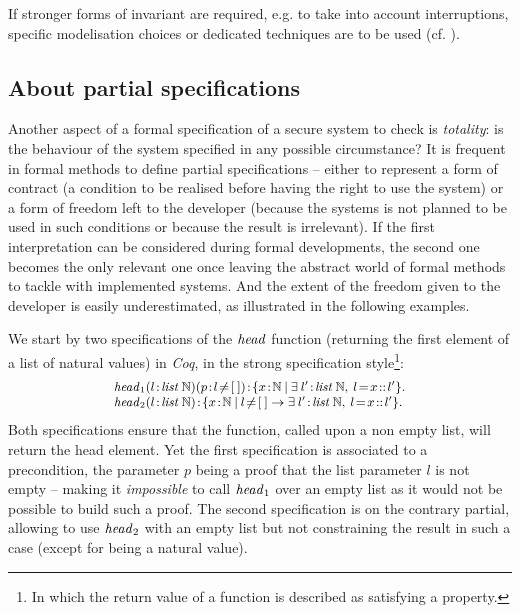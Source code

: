 \documentclass[conference]{IEEEtran}
\begin{document}
If stronger forms of invariant are required, e.g. to take into account interruptions, specific
modelisation choices or dedicated techniques are to be used (cf.
\cite{DBLP:conf/fm/AndronickCP05}).

\subsection{About partial specifications}\label{partial_spec}

Another aspect of a formal specification of a secure system to check is \emph{totality}: is
the behaviour of the system specified in any possible circumstance? It is frequent in formal
methods to define partial specifications -- either to represent a form of contract (a
condition to be realised before having the right to use the system) or a form of freedom left
to the developer (because the systems is not planned to be used in such conditions or because
the result is irrelevant). If the first interpretation can be considered during formal
developments, the second one becomes the only relevant one once leaving the abstract world of
formal methods to tackle with implemented systems. And the extent of the freedom given to the
developer is easily underestimated, as illustrated in the following examples.

We start by two specifications of the {\small$\textrm{\emph{head}}$} function (returning the first
element of a list of natural values) in \emph{Coq}, in the strong specification
style\footnote{In which the return value of a function is described as satisfying a property.}:
\[\small\begin{array}{l}
\fid{head}_1(l\!:\!\fid{list}\:\NAT)(p\!:\!l\!\not=\![\:])\!:\!
 \{x\!:\!\NAT\:|\:\exists\:l'\!:\!\fid{list}\:\NAT,\:l\!=\!x\!::\!l'\}.\\
\fid{head}_2(l\!:\!\fid{list}\:\NAT)\!:\!
 \{x\!:\!\NAT\:|\:l\!\not=\![\:]\to\exists\:l'\!:\!\fid{list}\:\NAT,\:l\!=\!x\!::\!l'\}.\\
\end{array}\]
Both specifications ensure that the function, called upon a non empty list, will return the
head element. Yet the first specification is associated to a precondition, the parameter
{\small$p$} being a proof that the list parameter {\small$l$} is  not empty -- making it
\emph{impossible} to call {\small$\textrm{\emph{head}}_1$} over an empty list as it would not be
possible to build such a proof. The second specification is on the contrary partial, allowing
to use {\small$\textrm{\emph{head}}_2$} with an empty list but not constraining the result in such a
case (except for being a natural value).
\end{document}
